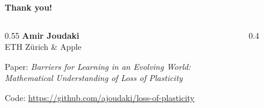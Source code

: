 \documentclass[11pt,aspectratio=169]{beamer}
\begin{document}
\begin{closingframe}

{\vspace*{-80pt}
\hfill\fontsize{20}{20}\selectfont\faApple}%

\vspace{50pt}

\textbf{\Large Thank you!}

\vspace{8mm}

\begin{columns}[onlytextwidth]
\begin{column}{0.55\textwidth}
\textbf{Amir Joudaki}\\
ETH Z\"urich \& Apple\\

\medskip

Paper: \emph{Barriers for Learning in an Evolving World:\\Mathematical Understanding of Loss of Plasticity}

\smallskip

Code: \url{https://github.com/ajoudaki/loss-of-plasticity}
\end{column}
\begin{column}{0.4\textwidth}
\raggedleft
\vspace{-2mm}

\vspace{4mm}

\end{column}
\end{columns}

\end{closingframe}
\end{document}
